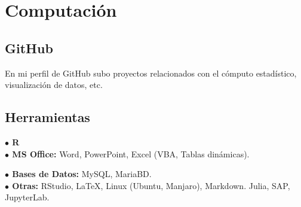 \documentclass[11pt,letterpaper]{article}
\begin{document}
\section*{\textcolor{title}{Computación \hrulefill}}

\subsection*{GitHub}

En mi perfil de GitHub subo proyectos relacionados con el cómputo estadístico, visualización de datos, etc.

\vspace{1mm}
\subsection*{Herramientas}
\setlength{\parskip}{1pt}
\begin{multicols}{2}

\textbf{$\bullet$ R}\\
\textbf{$\bullet$ MS Office: } Word, PowerPoint, Excel (VBA, Tablas dinámicas).

\columnbreak

\textbf{$\bullet$ Bases de Datos:} MySQL, MariaBD.\\
\textbf{$\bullet$ Otras: }RStudio, LaTeX, Linux (Ubuntu, Manjaro), Markdown. Julia, SAP, JupyterLab.
      \par  
\end{multicols}
\end{document}
